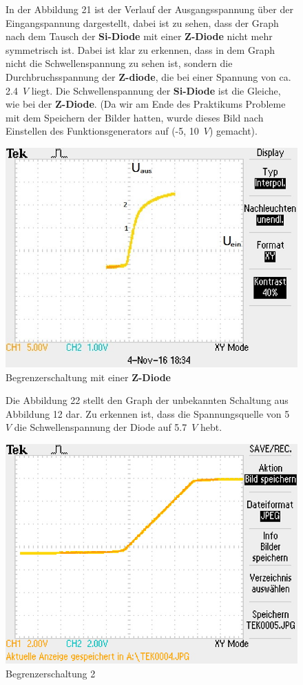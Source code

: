 \begin{figure}[!h]
In der Abbildung 21 ist der Verlauf der Ausgangsspannung \"uber der Eingangspannung dargestellt, dabei ist zu sehen, dass der Graph nach dem Tausch der \textbf{Si-Diode} mit einer \textbf{Z-Diode} nicht mehr symmetrisch ist. Dabei ist klar zu erkennen, dass in dem Graph nicht die Schwellenspannung zu sehen ist, sondern die Durchbruchsspannung der \textbf{Z-diode}, die bei einer Spannung von ca. 2.4~$V$ liegt. Die Schwellenspannung der \textbf{Si-Diode} ist die Gleiche, wie bei der \textbf{Z-Diode}.
(Da wir am Ende des Praktikums Probleme mit dem Speichern der Bilder hatten, wurde dieses Bild nach Einstellen des Funktionsgenerators auf (-5, 10~$V$) gemacht).
\begin{center}
\includegraphics[scale=0.8]{Versuch4/TEK0001}
\caption{Begrenzerschaltung mit einer \textbf{Z-Diode}}
\end{center}
\end{figure}
\begin{figure}[!h]
Die Abbildung 22 stellt den Graph der unbekannten Schaltung aus Abbildung 12 dar. Zu erkennen ist, dass die Spannungsquelle von 5~$V$ die Schwellenspannung der Diode auf 5.7~$V$ hebt.
\begin{center}
\includegraphics[scale=0.8]{Bilder/Versuch2/Limiter2}
\caption{Begrenzerschaltung 2}
\end{center}
\end{figure}